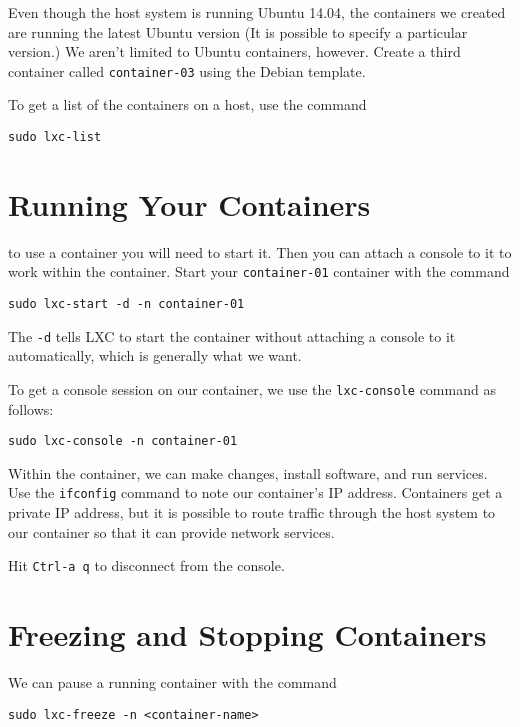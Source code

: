 \documentclass{article}
\begin{document}
Even though the host system is running Ubuntu 14.04, the containers we created are running the latest Ubuntu version (It is possible to specify a particular version.) We aren't limited to Ubuntu containers, however.  Create a third container called \texttt{container-03} using the Debian template.

To get a list of the containers on a host, use the command

\begin{verbatim}
sudo lxc-list
\end{verbatim}

\section{Running Your Containers}
to use a container you will need to start it.  Then you can attach a console to it to work within the container.  Start your \texttt{container-01} container with the command

\begin{verbatim}
sudo lxc-start -d -n container-01
\end{verbatim}

The \texttt{-d} tells LXC to start the container without attaching a console to it automatically, which is generally what we want.

To get a console session on our container, we use the \texttt{lxc-console} command as follows:

\begin{verbatim}
sudo lxc-console -n container-01
\end{verbatim}

Within the container, we can make changes, install software, and run services. Use the \texttt{ifconfig} command to note our container's IP address. Containers get a private IP address, but it is possible to route traffic through the host system to our container so that it can provide network services.

Hit \texttt{Ctrl-a q} to disconnect from the console.

\section{Freezing and Stopping Containers}

We can pause a running container with the command 

\begin{verbatim}
sudo lxc-freeze -n <container-name>
\end{verbatim} 
\end{document}
